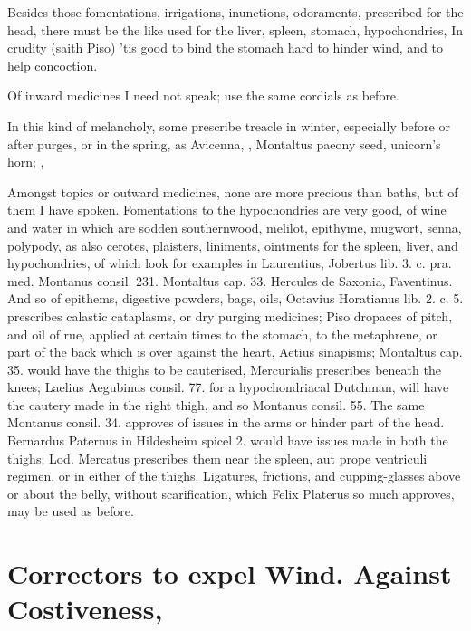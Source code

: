 Besides those fomentations, irrigations, inunctions, odoraments,
prescribed for the head, there must be the like used for the liver,
spleen, stomach, hypochondries, \etc{} In crudity (saith Piso) 'tis
good to bind the stomach hard to hinder wind, and to help concoction.

Of inward medicines I need not speak; use the same cordials as before.

In this kind of melancholy, some prescribe treacle in winter,
especially before or after purges, or in the spring, as Avicenna,
 , Montaltus paeony seed, unicorn's
horn; , \etc{}

Amongst topics or outward medicines, none are more precious than baths,
but of them I have spoken. Fomentations to the hypochondries are very
good, of wine and water in which are sodden southernwood, melilot,
epithyme, mugwort, senna, polypody, as also cerotes,
plaisters, liniments, ointments for the spleen, liver, and
hypochondries, of which look for examples in Laurentius, Jobertus lib.
3. c. pra. med. Montanus consil. 231. Montaltus cap. 33. Hercules de
Saxonia, Faventinus. And so of epithems, digestive powders, bags, oils,
Octavius Horatianus lib. 2. c. 5. prescribes calastic cataplasms, or
dry purging medicines; Piso dropaces of pitch, and oil of rue,
applied at certain times to the stomach, to the metaphrene, or part of
the back which is over against the heart, Aetius sinapisms; Montaltus
cap. 35. would have the thighs to be cauterised, Mercurialis
prescribes beneath the knees; Laelius Aegubinus consil. 77. for a
hypochondriacal Dutchman, will have the cautery made in the right
thigh, and so Montanus consil. 55. The same Montanus consil. 34.
approves of issues in the arms or hinder part of the head. Bernardus
Paternus in Hildesheim spicel 2. would have  issues made in both
the thighs; Lod. Mercatus prescribes them near the spleen, aut
prope ventriculi regimen, or in either of the thighs. Ligatures,
frictions, and cupping-glasses above or about the belly, without
scarification, which Felix Platerus so much approves, may be used
as before.

\section[To expel Wind. Against Constipation]{Correctors to expel Wind. Against Costiveness, \etc{}}

